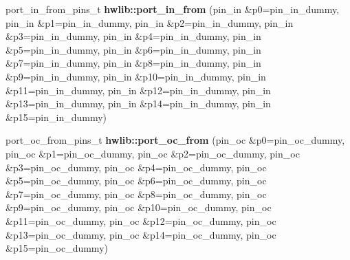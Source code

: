\begin{DoxyCompactItemize}
\item 
\mbox{\label{namespacehwlib_abf00acf523946d7999c99b467b239048}} 
port\+\_\+in\+\_\+from\+\_\+pins\+\_\+t {\bfseries hwlib\+::port\+\_\+in\+\_\+from} (pin\+\_\+in \&p0=pin\+\_\+in\+\_\+dummy, pin\+\_\+in \&p1=pin\+\_\+in\+\_\+dummy, pin\+\_\+in \&p2=pin\+\_\+in\+\_\+dummy, pin\+\_\+in \&p3=pin\+\_\+in\+\_\+dummy, pin\+\_\+in \&p4=pin\+\_\+in\+\_\+dummy, pin\+\_\+in \&p5=pin\+\_\+in\+\_\+dummy, pin\+\_\+in \&p6=pin\+\_\+in\+\_\+dummy, pin\+\_\+in \&p7=pin\+\_\+in\+\_\+dummy, pin\+\_\+in \&p8=pin\+\_\+in\+\_\+dummy, pin\+\_\+in \&p9=pin\+\_\+in\+\_\+dummy, pin\+\_\+in \&p10=pin\+\_\+in\+\_\+dummy, pin\+\_\+in \&p11=pin\+\_\+in\+\_\+dummy, pin\+\_\+in \&p12=pin\+\_\+in\+\_\+dummy, pin\+\_\+in \&p13=pin\+\_\+in\+\_\+dummy, pin\+\_\+in \&p14=pin\+\_\+in\+\_\+dummy, pin\+\_\+in \&p15=pin\+\_\+in\+\_\+dummy)
\item 
\mbox{\label{namespacehwlib_ac6c4a9ed80d5c7377b785ca72dc4e315}} 
port\+\_\+oc\+\_\+from\+\_\+pins\+\_\+t {\bfseries hwlib\+::port\+\_\+oc\+\_\+from} (pin\+\_\+oc \&p0=pin\+\_\+oc\+\_\+dummy, pin\+\_\+oc \&p1=pin\+\_\+oc\+\_\+dummy, pin\+\_\+oc \&p2=pin\+\_\+oc\+\_\+dummy, pin\+\_\+oc \&p3=pin\+\_\+oc\+\_\+dummy, pin\+\_\+oc \&p4=pin\+\_\+oc\+\_\+dummy, pin\+\_\+oc \&p5=pin\+\_\+oc\+\_\+dummy, pin\+\_\+oc \&p6=pin\+\_\+oc\+\_\+dummy, pin\+\_\+oc \&p7=pin\+\_\+oc\+\_\+dummy, pin\+\_\+oc \&p8=pin\+\_\+oc\+\_\+dummy, pin\+\_\+oc \&p9=pin\+\_\+oc\+\_\+dummy, pin\+\_\+oc \&p10=pin\+\_\+oc\+\_\+dummy, pin\+\_\+oc \&p11=pin\+\_\+oc\+\_\+dummy, pin\+\_\+oc \&p12=pin\+\_\+oc\+\_\+dummy, pin\+\_\+oc \&p13=pin\+\_\+oc\+\_\+dummy, pin\+\_\+oc \&p14=pin\+\_\+oc\+\_\+dummy, pin\+\_\+oc \&p15=pin\+\_\+oc\+\_\+dummy)
\end{DoxyCompactItemize}

